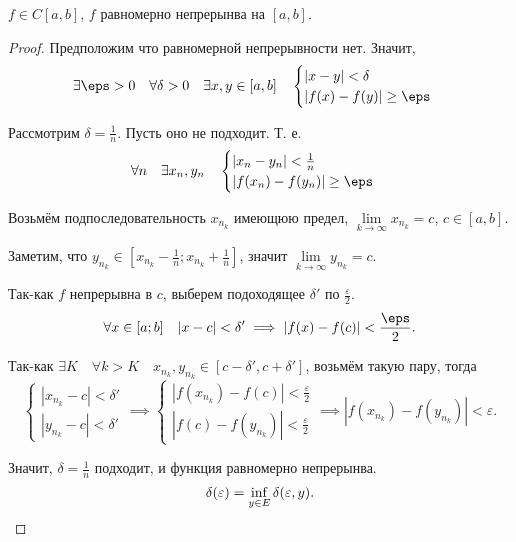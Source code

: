 \begin{theorem} \thmslashn

    $f\in C[a, b]$, $f$ равномерно непрерынва на $\left[a, b\right]$.
    \begin{proof} \thmslashn
    
        Предположим что равномерной непрерывности нет. Значит,
        \begin{equation*}
            \exists{\eps > 0}\quad \forall{\delta > 0}\quad \exists{x, y\in \left[a, b\right]}\quad      \begin{cases}
                |x - y| < \delta\\
                |f(x)-f(y)| \ge \eps
            \end{cases} 
        \end{equation*}

        Рассмотрим $\delta=\frac{1}{n}$. Пусть оно не подходит. Т. е.
        \begin{equation*}
            \forall{n} \quad \exists{x_n, y_n}\quad \begin{cases}
                |x_n - y_n| < \frac{1}{n}\\
                |f(x_n)-f(y_n)| \ge \eps
            \end{cases}  
        \end{equation*}

        Возьмём подпоследовательность $x_{n_k}$ имеющюю предел, $\lim\limits_{k \to \infty} x_{n_{k}} = c$, $c\in \left[a, b\right]$.
        
        Заметим, что $y_{n_k}\in \left[x_{n_k} - \frac{1}{n}; x_{n_k} + \frac{1}{n}\right]$, значит $\lim\limits_{k \to \infty} y_{n_k} = c$.
        
        Так-как $f$ непрерывна в $c$, выберем подоходящее $\delta'$ по $\frac{\varepsilon}{2}$.
        \[ \forall{x\in \left[a; b\right]}\quad |x-c| < \delta' \implies |f(x)-f(c)| < \frac{\eps}{2} .\]

        Так-как $\exists{K}\quad \forall{k > K}\quad x_{n_k}, y_{n_k}\in \left[c - \delta', c + \delta'\right]$, возьмём такую пару, тогда
        \[ \begin{cases}
            |x_{n_k} - c| < \delta'\\
            |y_{n_k} - c| < \delta'
        \end{cases} \implies \begin{cases}
        |f(x_{n_k})-f(c)| < \frac{\varepsilon}{2}\\
        |f(c) - f(y_{n_k})| < \frac{\varepsilon}{2}
    \end{cases} \implies |f(x_{n_k}) - f(y_{n_k})| < \varepsilon .\]
    
    Значит, $\delta = \frac{1}{n}$ подходит, и функция равномерно непрерынва.
        \[ \delta(\varepsilon) = \inf\limits_{y\in E} \delta(\varepsilon, y) .\qedhere\] 
    \end{proof}
\end{theorem}
